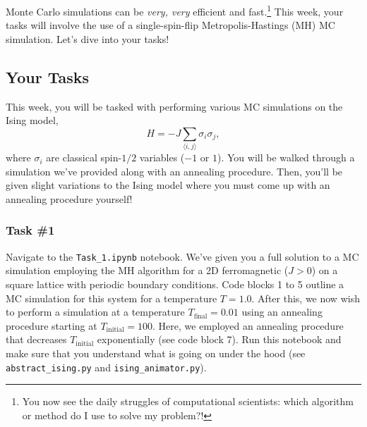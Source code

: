 \documentclass[12pt]{article}
\begin{document}
Monte Carlo simulations can be {\it very, very} efficient and fast.\footnote{You now see the daily struggles of computational scientists: which algorithm or method do I use to solve my problem?!} This week, your tasks will involve the use of a single-spin-flip Metropolis-Hastings (MH) MC simulation. Let's dive into your tasks!

\subsection*{Your Tasks}

This week, you will be tasked with performing various MC simulations on the Ising model,
\begin{equation}
    H = -J\sum_{\langle i,j \rangle} \sigma_i \sigma_j,
\end{equation}
where $\sigma_i$ are classical spin-$1/2$ variables ($-1$ or $1$). You will be walked through a simulation we've provided along with an annealing procedure. Then, you'll be given slight variations to the Ising model where you must come up with an annealing procedure yourself!

\subsubsection*{Task \#1}

Navigate to the \texttt{Task\_1.ipynb} notebook. We've given you a full solution to a MC simulation employing the MH algorithm for a 2D ferromagnetic ($J > 0$) on a square lattice with periodic boundary conditions. Code blocks 1 to 5 outline a MC simulation for this system for a temperature $T = 1.0$. After this, we now wish to perform a simulation at a temperature $T_{\text{final}} = 0.01$ using an annealing procedure starting at $T_{\text{initial}} = 100$. Here, we employed an annealing procedure that decreases $T_{\text{initial}}$ exponentially (see code block 7). Run this notebook and make sure that you understand what is going on under the hood (see \texttt{abstract\_ising.py} and \texttt{ising\_animator.py}).
\end{document}
